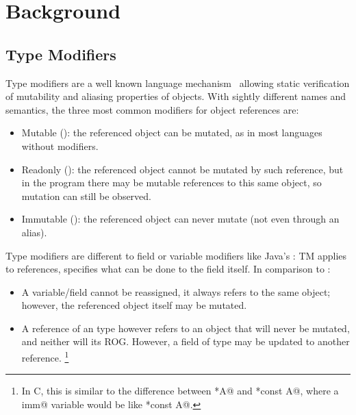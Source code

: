 

\section{Background}
\subsection{Type Modifiers}
Type modifiers are a well known language mechanism~\cite{TschantzErnst05,BirkaErnst04,OstlundEtAl08,clebsch2015deny,GianniniEtAl16,GordonEtAl12} allowing static verification of mutability and aliasing properties of objects.
With sightly different names and semantics, the three most common modifiers for object references are:
\begin{itemize}
\item Mutable (\Q@mut@): the referenced object can be mutated, as in most languages without modifiers.
\item Readonly (\Q@read@): the referenced object cannot be mutated by such reference, but in the program there may be mutable references to this same object, so mutation can still be observed. 
\item Immutable (\Q@imm@): the referenced object can never mutate (not even through an alias).
\end{itemize}
Type modifiers are different to field or variable modifiers like Java’s \Q@final@: TM applies to references,  \Q@final@ specifies what can be done to the field itself. In comparison to \Q@imm@ :

\begin{itemize}
\item A \Q@final@ variable/field cannot be reassigned, it always refers to the same object; however, the referenced object itself may be mutated.
\item A reference of an \Q@imm@ type however refers to an object that will never be mutated, and neither will its ROG. However, a field of type \Q@imm@ may be updated to another \Q@imm@ reference.
\footnote{In C, this is similar to the difference between \Q@const *A@ and \Q@*const A@, where a \Q@final imm@ variable would be like \Q@const *const A@.}
\end{itemize}



